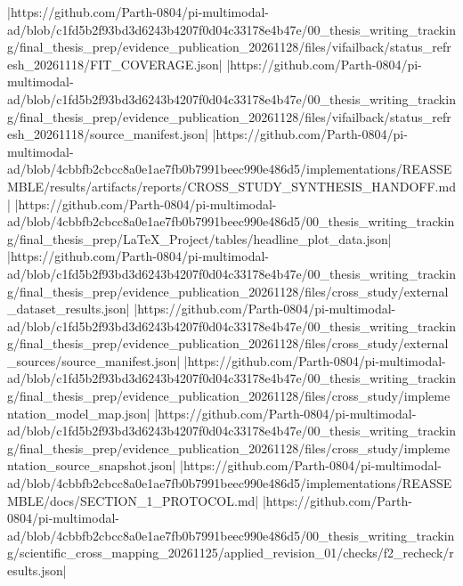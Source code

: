 |https://github.com/Parth-0804/pi-multimodal-ad/blob/c1fd5b2f93bd3d6243b4207f0d04c33178e4b47e/00_thesis_writing_tracking/final_thesis_prep/evidence_publication_20261128/files/vifailback/status_refresh_20261118/FIT_COVERAGE.json|
|https://github.com/Parth-0804/pi-multimodal-ad/blob/c1fd5b2f93bd3d6243b4207f0d04c33178e4b47e/00_thesis_writing_tracking/final_thesis_prep/evidence_publication_20261128/files/vifailback/status_refresh_20261118/source_manifest.json|
|https://github.com/Parth-0804/pi-multimodal-ad/blob/4cbbfb2cbcc8a0e1ae7fb0b7991beec990e486d5/implementations/REASSEMBLE/results/artifacts/reports/CROSS_STUDY_SYNTHESIS_HANDOFF.md|
|https://github.com/Parth-0804/pi-multimodal-ad/blob/4cbbfb2cbcc8a0e1ae7fb0b7991beec990e486d5/00_thesis_writing_tracking/final_thesis_prep/LaTeX_Project/tables/headline_plot_data.json|
|https://github.com/Parth-0804/pi-multimodal-ad/blob/c1fd5b2f93bd3d6243b4207f0d04c33178e4b47e/00_thesis_writing_tracking/final_thesis_prep/evidence_publication_20261128/files/cross_study/external_dataset_results.json|
|https://github.com/Parth-0804/pi-multimodal-ad/blob/c1fd5b2f93bd3d6243b4207f0d04c33178e4b47e/00_thesis_writing_tracking/final_thesis_prep/evidence_publication_20261128/files/cross_study/external_sources/source_manifest.json|
|https://github.com/Parth-0804/pi-multimodal-ad/blob/c1fd5b2f93bd3d6243b4207f0d04c33178e4b47e/00_thesis_writing_tracking/final_thesis_prep/evidence_publication_20261128/files/cross_study/implementation_model_map.json|
|https://github.com/Parth-0804/pi-multimodal-ad/blob/c1fd5b2f93bd3d6243b4207f0d04c33178e4b47e/00_thesis_writing_tracking/final_thesis_prep/evidence_publication_20261128/files/cross_study/implementation_source_snapshot.json|
|https://github.com/Parth-0804/pi-multimodal-ad/blob/4cbbfb2cbcc8a0e1ae7fb0b7991beec990e486d5/implementations/REASSEMBLE/docs/SECTION_1_PROTOCOL.md|
|https://github.com/Parth-0804/pi-multimodal-ad/blob/4cbbfb2cbcc8a0e1ae7fb0b7991beec990e486d5/00_thesis_writing_tracking/scientific_cross_mapping_20261125/applied_revision_01/checks/f2_recheck/results.json|
